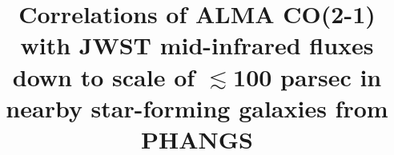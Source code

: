 \documentclass[twocolumn]{aastex7}
\begin{document}
\title{Correlations of ALMA CO(2-1) with JWST mid-infrared fluxes down to scale of $\lesssim$100 parsec in nearby star-forming galaxies from PHANGS}

\end{document}
